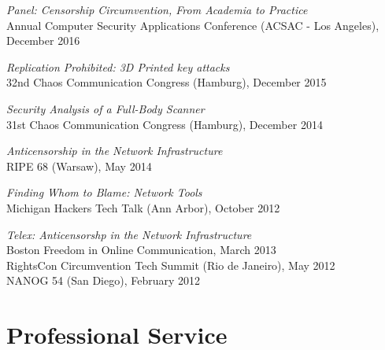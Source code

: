 \documentclass[margin,11pt]{res} %
\begin{document}
\emph{Panel: Censorship Circumvention, From Academia to Practice} \\
    Annual Computer Security Applications Conference (ACSAC - Los Angeles), December 2016

\emph{Replication Prohibited: 3D Printed key attacks} \\
    32nd Chaos Communication Congress (Hamburg), December 2015

\emph{Security Analysis of a Full-Body Scanner} \\
    31st Chaos Communication Congress (Hamburg), December 2014

\emph{Anticensorship in the Network Infrastructure} \\
    RIPE 68 (Warsaw), May 2014


\emph{Finding Whom to Blame: Network Tools} \\
    Michigan Hackers Tech Talk (Ann Arbor), October 2012

\emph{Telex: Anticensorshp in the Network Infrastructure} \\
    Boston Freedom in Online Communication, March 2013\\
    RightsCon Circumvention Tech Summit (Rio de Janeiro), May 2012 \\
    NANOG 54 (San Diego), February 2012 %




\vspace{6pt}
\section{\large Professional Service}
\end{document}
